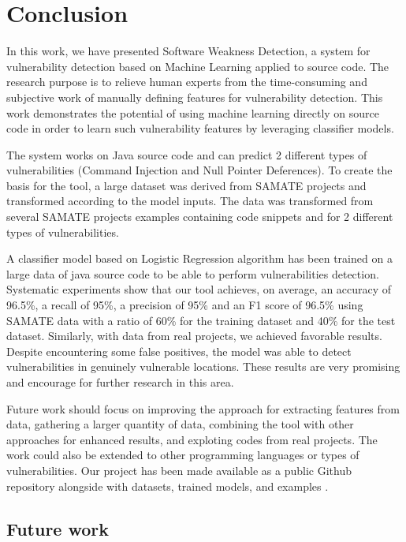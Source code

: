 % 
%  
%



\chapter{Conclusion}
\label{cha:Conclusion_chapter}

In this work, we have presented Software Weakness Detection, a system for vulnerability detection based on Machine Learning applied to source code. The research purpose is to relieve human experts from the time-consuming and subjective work of manually defining features for vulnerability detection. This work demonstrates the potential of using machine learning directly on source code in order to learn such vulnerability features by leveraging classifier models.

The system works on Java source code and can predict 2 different types of vulnerabilities (Command Injection and Null Pointer Deferences). To create the basis for the tool, a large dataset was derived from SAMATE projects and transformed according to the model inputs. The data was transformed from several SAMATE projects examples containing code snippets and for 2 different types of vulnerabilities. 

A classifier model based on Logistic Regression algorithm has been trained on a large data of java source code to be able to perform vulnerabilities detection. Systematic experiments show that our tool achieves, on average, an accuracy of 96.5\%, a recall of 95\%, a precision of 95\% and an F1 score of 96.5\% using SAMATE data with a ratio of 60\% for the training dataset and 40\% for the test dataset. Similarly, with data from real projects, we achieved favorable results. Despite encountering some false positives, the model was able to detect vulnerabilities in genuinely vulnerable locations. These results are very promising and encourage for further research in this area.

Future work should focus on improving the approach for extracting features from data, gathering a larger quantity of data, combining the tool with other approaches for enhanced results, and exploting codes from real projects. The work could also be extended to other programming languages or types of vulnerabilities. Our project has been made available as a public Github repository alongside with datasets, trained models, and examples \cite{sanaconte2023}.

\section{Future work} %
\label{sec:Future_work}

